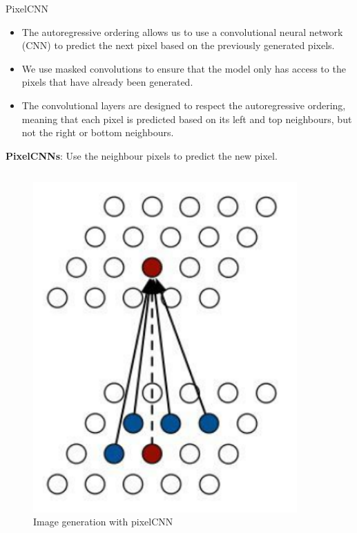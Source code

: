 \begin{frame}[allowframebreaks]{PixelCNN}
\framebreak
\begin{itemize}
    \item The autoregressive ordering allows us to use a convolutional neural network (CNN) to predict the next pixel based on the previously generated pixels.
    \item We use masked convolutions to ensure that the model only has access to the pixels that have already been generated.
    \item The convolutional layers are designed to respect the autoregressive ordering, meaning that each pixel is predicted based on its left and top neighbours, but not the right or bottom neighbours.
\end{itemize}
\framebreak
\textbf{PixelCNNs}: Use the neighbour pixels to predict the new pixel.
\begin{columns}
        \begin{column}{0.5\textwidth}
            \begin{figure}
                \centering
                \includegraphics[width=0.9\textwidth, keepaspectratio]{images/arm/pixelcnn.png}
                \caption{Image generation with pixelCNN}
            \end{figure}

\end{column}
\end{columns}
\end{frame}
